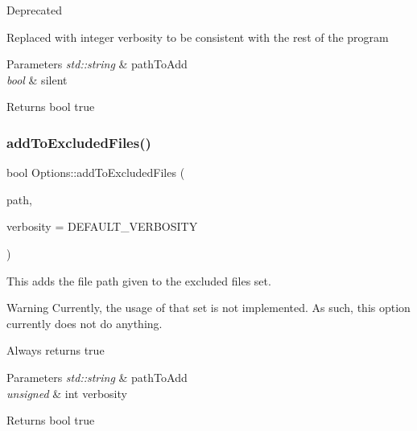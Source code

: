 \begin{DoxyRefDesc}{Deprecated}
\item[\mbox{\hyperlink{deprecated__deprecated000016}{Deprecated}}]Replaced with integer verbosity to be consistent with the rest of the program\end{DoxyRefDesc}



\begin{DoxyParams}{Parameters}
{\em std\+::string} & path\+To\+Add \\
\hline
{\em bool} & silent\\
\hline
\end{DoxyParams}
\begin{DoxyReturn}{Returns}
bool true 
\end{DoxyReturn}
\mbox{\label{classOptions_a9246884cfd991132e0d9be8c13146b54}} 
\subsubsection{\texorpdfstring{addToExcludedFiles()}{addToExcludedFiles()}\hspace{0.1cm}{\footnotesize\ttfamily [2/2]}}
{\footnotesize\ttfamily bool Options\+::add\+To\+Excluded\+Files (\begin{DoxyParamCaption}\item[{std\+::string}]{path,  }\item[{unsigned int}]{verbosity = {\ttfamily DEFAULT\+\_\+VERBOSITY} }\end{DoxyParamCaption})}



This adds the file path given to the excluded files set. 

\begin{DoxyWarning}{Warning}
Currently, the usage of that set is not implemented. As such, this option currently does not do anything.
\end{DoxyWarning}
Always returns true


\begin{DoxyParams}{Parameters}
{\em std\+::string} & path\+To\+Add \\
\hline
{\em unsigned} & int verbosity\\
\hline
\end{DoxyParams}
\begin{DoxyReturn}{Returns}
bool true 
\end{DoxyReturn}
\mbox{\label{classOptions_ae84bbfbd999a4fddbbb0c549189f07dd}} 
